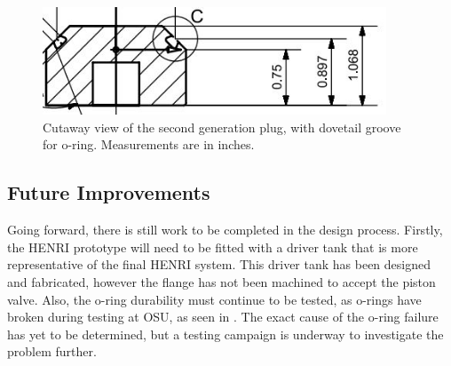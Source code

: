 
\begin{figure}[htbp]
    \vspace{16pt}
    \centering
    \includegraphics[width=4.032in]{design/photos/dovetail.JPG}
    \caption{Cutaway view of the second generation plug, with dovetail groove for o-ring. Measurements are in inches.}
    \label{fig:Dovetail Groove}
    \vspace{16pt}
\end{figure}




\subsection{Future Improvements} \label{s:improvements}
Going forward, there is still work to be completed in the design process. Firstly, the HENRI prototype will need to be fitted with a driver tank that is more representative of the final HENRI system. This driver tank has been designed and fabricated, however the flange has not been machined to accept the piston valve. Also, the o-ring durability must continue to be tested, as o-rings have broken during testing at OSU, as seen in . The exact cause of the o-ring failure has yet to be determined, but a testing campaign is underway to investigate the problem further.


